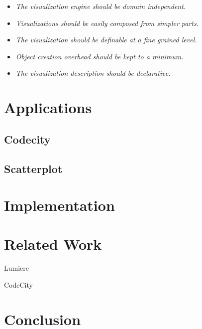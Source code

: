 \documentclass[runningheads]{llncs}
\newcommand{\seclabel}[1]{\label{sec:#1}}
\begin{document}
\begin{itemize}
\item \emph{The visualization engine should be domain independent.}
\item \emph{Visualizations should be easily composed from simpler parts.}
\item \emph{The visualization should be definable at a fine grained level.}
\item \emph{Object creation overhead should be kept to a minimum.}
\item \emph{The visualization description should be declarative.}
\end{itemize}

\section{Applications} \seclabel{applications}

\subsection{Codecity}

\subsection{Scatterplot}


\section{Implementation} \seclabel{implementation}

\section{Related Work} \seclabel{relatedwork}

Lumiere~\cite{Oliv09a}

CodeCity~\cite{Wett08d}

\section{Conclusion} \seclabel{conclusion}
\end{document}
